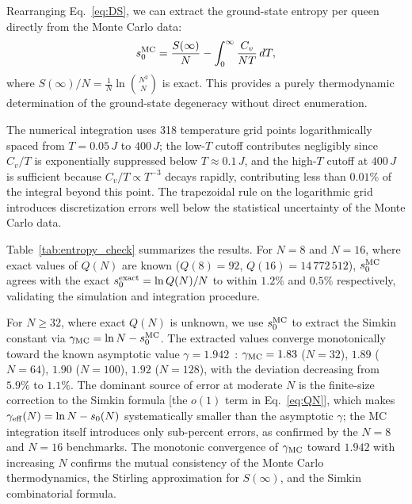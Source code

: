 \documentclass[aps, pre, reprint, amsmath, amssymb, superscriptaddress, floatfix]{revtex4-2}
\begin{document}
Rearranging Eq.~\eqref{eq:DS}, we can extract the ground-state
entropy per queen directly from the Monte Carlo data:
\begin{equation}
  s_0^{\rm MC}
  = \frac{S(\infty)}{N} - \int_0^\infty \frac{C_v}{NT}\,dT,
  \label{eq:s0_MC}
\end{equation}
where $S(\infty)/N = \frac{1}{N}\ln\binom{N^2}{N}$ is exact.
This provides a purely thermodynamic determination of the
ground-state degeneracy without direct enumeration.

The numerical integration uses 318 temperature grid points
logarithmically spaced from $T = 0.05\,J$ to $400\,J$; the low-$T$
cutoff contributes negligibly since $C_v/T$ is exponentially
suppressed below $T \approx 0.1\,J$, and the high-$T$ cutoff at
$400\,J$ is sufficient because $C_v/T \propto T^{-3}$ decays
rapidly, contributing less than $0.01\%$ of the integral beyond
this point.  The trapezoidal rule on the logarithmic grid introduces
discretization errors well below the statistical uncertainty of the
Monte Carlo data.

Table~\ref{tab:entropy_check} summarizes the results.
For $N = 8$ and $N = 16$, where exact values of $Q(N)$ are known
($Q(8) = 92$, $Q(16) = 14\,772\,512$), $s_0^{\rm MC}$ agrees with
the exact $s_0^{\rm exact} = \ln Q(N)/N$ to within $1.2\%$ and
$0.5\%$ respectively, validating the simulation and integration
procedure.

For $N \ge 32$, where exact $Q(N)$ is unknown, we use $s_0^{\rm MC}$
to extract the Simkin constant via
$\gamma_{\rm MC} = \ln N - s_0^{\rm MC}$.
The extracted values converge monotonically toward the known
asymptotic value $\gamma = 1.942$~\cite{Simkin2022,Nobel2023}:
$\gamma_{\rm MC} = 1.83$ ($N = 32$), $1.89$ ($N = 64$),
$1.90$ ($N = 100$), $1.92$ ($N = 128$), with the deviation
decreasing from $5.9\%$ to $1.1\%$.
The dominant source of error at moderate $N$ is the finite-size
correction to the Simkin formula [the $o(1)$ term in
Eq.~\eqref{eq:QN}], which makes $\gamma_{\rm eff}(N)
= \ln N - s_0(N)$ systematically smaller than the asymptotic
$\gamma$; the MC integration itself introduces only sub-percent
errors, as confirmed by the $N = 8$ and $N = 16$ benchmarks.
The monotonic convergence of $\gamma_{\rm MC}$ toward $1.942$ with
increasing $N$ confirms the mutual consistency of the Monte Carlo
thermodynamics, the Stirling approximation for $S(\infty)$, and the
Simkin combinatorial formula.
\end{document}
